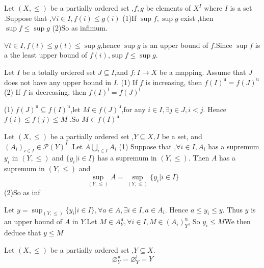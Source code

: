 \documentclass{book}
\begin{document}
\begin{propositionenv}
    Let $(X,\le )$ be a partially ordered set ,$f,g$ be elements of $X^I$ where $I$ is a set .Suppose that ,$\forall i\in  I ,f(i)\le g(i)$
 \newline
 (1)If $\sup f,\sup g$ exist ,then $\sup f\le\sup g$
 \newline
 (2)So as infimum.
\end{propositionenv}
\begin{proofenv}
    $\forall t\in I,f(t)\le g(t)\le \sup g$,hence $\sup g$ is an upper bound of $f$.Since $\sup f $ is a the least upper bound of $f(i)$,$\sup f\le\sup g$.
\end{proofenv}
\begin{propositionenv}
    Let $I$ be a totally ordered set $J\subseteq I $,and $f:I\rightarrow X $ be a mapping. Assume that $J$ does not have any upper bound in $I$.
    \newline 
    (1) If $f$ is increasing, then $f(I)^\mathrm{u}=f(J)^\mathrm{u}$
    \newline
    (2) If $f$ is decreasing, then $f(I)^\mathrm{l}=f(J)^\mathrm{l}$
\end{propositionenv}
\begin{proofenv}
    \quad 
    \newline
    (1) $f(J)^\mathrm{u}\subseteq f(I)^\mathrm{u}$,let $M\in f(J)^\mathrm{u}$,for any $i\in I,\exists j\in J,i<j$. Hence $f(i)\le f(j)\le M$ .So $M\in f(I)^\mathrm{u}$
\end{proofenv}
\begin{propositionenv}
    Let $(X,\le)$ be a partially ordered set ,$Y\subseteq X,I$ be a set, and $(A_i)_{i\in I}\in \mathcal{P} (Y)^I$ .Let $A\bigcup _{i\in I}A_i$
    \newline
    (1) Suppose that ,$\forall i \in I,A_i$ has a supremum $y_i$ in $(Y,\le)$ and $\{y_i|i\in I\}$ has a supremum in $(Y,\le)$. Then $A$ has a supremum in $(Y,\le )$ and $$\sup_{(Y,\le)}A=\sup_{(Y,\le)}\{y_i|i\in I\}$$
    \newline
    (2)So as inf
\end{propositionenv}
\begin{proofenv}
    Let $y=\sup_{(Y,\le)}\{y_i|i\in I\},\forall a\in A ,\exists i\in I,a\in A_i$. Hence $a\le y_i\le y$. Thus $y $ is an upper bound of $A$ in $Y$.Let $M\in A_Y^\mathrm{u},\forall i \in I,M\in (A_i)_Y^\mathrm{u}$, So $y_i \le M $We then deduce that $y\le M$
\end{proofenv}
\begin{propositionenv}
    Let $(X,\le)$ be a partially ordered set ,$Y\subseteq X$.$$\varnothing_Y^\mathrm{u}=\varnothing_Y^\mathrm{l}=Y$$
\end{propositionenv}
\end{document}
